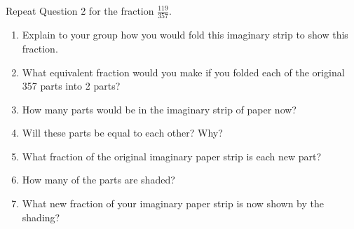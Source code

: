 \documentclass{ximera}
\begin{document}
\begin{question}
 Repeat Question 2 for the fraction $\frac{119}{357}$. 
\begin{enumerate}
    \item Explain to your group how you would fold this imaginary strip to show this fraction.    
    \item What equivalent fraction would you make if you folded each of the original 357 parts into 2 parts?
   \item   How many parts would be in the imaginary strip of paper now?
    \item  Will these parts be equal to each other?  Why?
    \item   What fraction of the original imaginary paper strip is each new part?
    \item   How many of the parts are shaded?
    \item   What new fraction of your imaginary paper strip is now shown by the shading?  
\end{enumerate}
\end{question}
\end{document}
